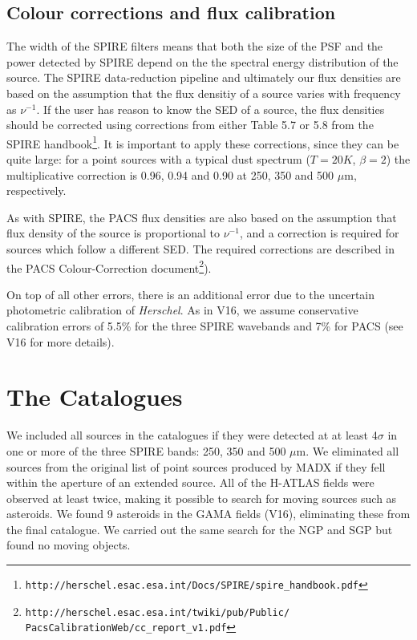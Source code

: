 \documentclass[useAMS,usenatbib]{mn2e}
\begin{document}
\subsection{Colour corrections and flux calibration}

The width of the SPIRE filters means that both the size of the
PSF and the power detected by SPIRE depend on the
the spectral energy distribution of the source.
The SPIRE data-reduction pipeline and ultimately our flux
densities are based on the assumption that
the flux densitiy of a
source
varies with frequency as $\nu^{-1}$. 
If the user has reason to know the SED of a source, the
flux densities should be corrected using corrections
from either Table 5.7 or 5.8 from the
SPIRE handbook\footnote{\tt{http://herschel.esac.esa.int/Docs/SPIRE/spire\_handbook.pdf}}.
It is important to apply these corrections, since they can be quite
large: for a point sources with a typical dust spectrum
($T=20K$, $\beta=2$) the multiplicative correction
is 0.96, 0.94 and 0.90 at 250, 350 and 500 $\mu$m, respectively.

As with SPIRE, the PACS flux densities are also based on the
assumption that flux density of the source is proportional to $\nu^{-1}$, and
a correction is required for sources which follow a different SED. The
required corrections are described in the PACS Colour-Correction
document\footnote{\tt{http://herschel.esac.esa.int/twiki/pub/Public/
  PacsCalibrationWeb/cc\_report\_v1.pdf}}).

On top of all other errors, there is an additional error due to the
uncertain photometric calibration of {\it Herschel}. As in V16, we assume
conservative calibration errors of 5.5\% for the three SPIRE wavebands
and 7\% for PACS (see V16 for more details).

\section{The Catalogues}

We included all sources in the catalogues if they were detected
at at least 4$\sigma$ in one or more of the three SPIRE bands: 250,
350 and 500 $\mu$m.
We eliminated all sources from the original list of point sources produced
by MADX if they fell within the aperture of an extended source. All of the H-ATLAS
fields were observed at least twice, making it possible to search for moving sources
such as asteroids. We found 9 asteroids in the GAMA fields (V16), eliminating these
from the final catalogue. We carried out the same search for the NGP and SGP but found
no moving objects.
\end{document}
